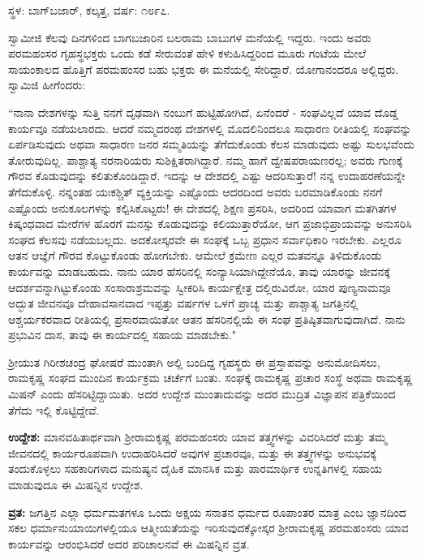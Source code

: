 \begin{center}
ಸ್ಥಳ: ಬಾಗ್‌ಬಜಾರ್, ಕಲ್ಕತ್ತ, ವರ್ಷ: ೧೮೯೭.
\end{center}

ಸ್ವಾಮೀಜಿ ಕೆಲವು ದಿನಗಳಿಂದ ಬಾಗಬಜಾರಿನ ಬಲರಾಮ ಬಾಬುಗಳ ಮನೆಯಲ್ಲಿ ಇದ್ದರು. ಇಂದು ಅವರು ಪರಮಹಂಸರ ಗೃಹಸ್ಥಭಕ್ತರು ಒಂದು ಕಡೆ ಸೇರುವಂತೆ ಹೇಳಿ ಕಳುಹಿಸಿದ್ದರಿಂದ ಮೂರು ಗಂಟೆಯ ಮೇಲೆ ಸಾಯಂಕಾಲದ ಹೊತ್ತಿಗೆ ಪರಮಹಂಸರ ಬಹು ಭಕ್ತರು ಈ ಮನೆಯಲ್ಲಿ ಸೇರಿದ್ದಾರೆ. ಯೋಗಾನಂದರೂ ಅಲ್ಲಿದ್ದರು. ಸ್ವಾಮಿಜಿ ಹೀಗೆಂದರು:

“ನಾನಾ ದೇಶಗಳನ್ನು ಸುತ್ತಿ ನನಗೆ ದೃಢವಾಗಿ ನಂಬುಗೆ ಹುಟ್ಟಿಹೋಗಿದೆ, ಏನೆಂದರೆ - ಸಂಘವಿಲ್ಲದೆ ಯಾವ ದೊಡ್ಡ ಕಾರ್ಯವೂ ನಡೆಯಲಾರದು. ಆದರೆ ನಮ್ಮದರಂಥ ದೇಶಗಳಲ್ಲಿ ಮೊದಲಿನಿಂದಲೂ ಸಾಧಾರಣ ರೀತಿಯಲ್ಲಿ ಸಂಘವನ್ನು ಏರ್ಪಡಿಸುವುದು ಅಥವಾ ಸಾಧಾರಣ ಜನರ ಸಮ್ಮತಿಯನ್ನು ತೆಗೆದುಕೊಂಡು ಕೆಲಸ ಮಾಡುವುದು ಅಷ್ಟು ಸುಲಭವೆಂದು ತೋರುವುದಿಲ್ಲ. ಪಾಶ್ಚಾತ್ಯ ನರನಾರಿಯರು ಸುಶಿಕ್ಷಿತರಾಗಿದ್ದಾರೆ. ನಮ್ಮ ಹಾಗೆ ದ್ವೇಷಪರಾಯಣರಲ್ಲ; ಅವರು ಗುಣಕ್ಕೆ ಗೌರವ ಕೊಡುವುದನ್ನು ಕಲಿತುಕೊಂಡಿದ್ದಾರೆ. ಇದನ್ನು ಆ ದೇಶದಲ್ಲಿ ಎಷ್ಟು ಆದರಿಸುತ್ತಾರೆ! ನನ್ನ ಉದಾಹರಣೆಯನ್ನೇ ತೆಗೆದುಕೊಳ್ಳಿ. ನನ್ನಂತಹ ಯಃಕಶ್ಚಿತ್ ವ್ಯಕ್ತಿಯನ್ನು ಎಷ್ಟೊಂದು ಆದರದಿಂದ ಅವರು ಬರಮಾಡಿಕೊಂಡು ನನಗೆ ಎಷ್ಟೊಂದು ಅನುಕೂಲಗಳನ್ನು ಕಲ್ಪಿಸಿಕೊಟ್ಟರು! ಈ ದೇಶದಲ್ಲಿ ಶಿಕ್ಷಣ ಪ್ರಸರಿಸಿ, ಅದರಿಂದ ಯಾವಾಗ ಮತಗಿತಗಳ ಕಿಷ್ಕಂಧವಾದ ಮೇರೆಗಳ ಹೊರಗೆ ಮನಸ್ಸು ಕೊಡುವುದನ್ನು ಕಲಿಯುತ್ತಾರೆಯೋ, ಆಗ ಪ್ರಜಾಭಿಪ್ರಾಯವನ್ನು ಅನುಸರಿಸಿ ಸಂಘದ ಕೆಲಸವು ನಡೆಯಬಲ್ಲದು. ಅದಕೋಸ್ಕರವೇ ಈ ಸಂಘಕ್ಕೆ ಒಬ್ಬ ಪ್ರಧಾನ ಸರ್ವಾಧಿಕಾರಿ ಇರಬೇಕು. ಎಲ್ಲರೂ ಆತನ ಆಜ್ಞೆಗೆ ಗೌರವ ಕೊಟ್ಟುಕೊಂಡು ಹೋಗಬೇಕು. ಆಮೇಲೆ ಕ್ರಮೇಣ ಎಲ್ಲರ ಮತವನ್ನೂ ತಿಳಿದುಕೊಂಡು ಕಾರ್ಯವನ್ನು ಮಾಡಬಹುದು. ನಾನು ಯಾರ ಹೆಸರಿನಲ್ಲಿ ಸಂನ್ಯಾಸಿಯಾಗಿದ್ದೇನೆಯೊ, ತಾವು ಯಾರನ್ನು ಜೀವನಕ್ಕೆ ಆದರ್ಶವನ್ನಾಗಿಟ್ಟುಕೊಂಡು ಸಂಸಾರಾಶ್ರಮವನ್ನು ಸ್ವೀಕರಿಸಿ ಕಾರ್ಯಕ್ಷೇತ್ರ ದಲ್ಲಿರುವಿರೋ, ಯಾರ ಪುಣ್ಯನಾಮವೂ ಅದ್ಭುತ ಜೀವನವೂ ದೇಹಾವಸಾನವಾದ ಇಪ್ಪತ್ತು ವರ್ಷಗಳ ಒಳಗೆ ಪ್ರಾಚ್ಯ ಮತ್ತು ಪಾಶ್ಚಾತ್ಯ ಜಗತ್ತಿನಲ್ಲಿ ಆಶ್ಚರ್ಯಕರವಾದ ರೀತಿಯಲ್ಲಿ ಪ್ರಸಾರವಾಯಿತೋ ಆತನ ಹೆಸರಿನಲ್ಲಿಯೆ ಈ ಸಂಘ ಪ್ರತಿಷ್ಠಿತವಾಗುವುದಾಗಿದೆ. ನಾನು ಪ್ರಭುವಿನ ದಾಸ, ತಾವು ಈ ಕಾರ್ಯದಲ್ಲಿ ಸಹಾಯ ಮಾಡಬೇಕು."

ಶ‍್ರೀಯುತ ಗಿರೀಶಚಂದ್ರ ಘೋಷರೆ ಮುಂತಾಗಿ ಅಲ್ಲಿ ಬಂದಿದ್ದ ಗೃಹಸ್ಥರು ಈ ಪ್ರಸ್ತಾಪವನ್ನು ಅನುಮೋದಿಸಲು, ರಾಮಕೃಷ್ಣ ಸಂಘದ ಮುಂದಿನ ಕಾರ್ಯಕ್ರಮ ಚರ್ಚೆಗೆ ಬಂತು. ಸಂಘಕ್ಕೆ ರಾಮಕೃಷ್ಣ ಪ್ರಚಾರ ಸಂಸ್ಥೆ ಅಥವಾ ರಾಮಕೃಷ್ಣ ಮಿಷನ್ ಎಂದು ಹೆಸರಿಟ್ಟಿದ್ದಾಯಿತು. ಅದರ ಉದ್ದೇಶ ಮುಂತಾದುವನ್ನು ಅದರ ಮುದ್ರಿತ ವಿಜ್ಞಾಪನ ಪತ್ರಿಕೆಯಿಂದ ತೆಗೆದು ಇಲ್ಲಿ ಕೊಟ್ಟಿದ್ದೇವೆ.

\textbf{ಉದ್ದೇಶ:} ಮಾನವಹಿತಾರ್ಥವಾಗಿ ಶ‍್ರೀರಾಮಕೃಷ್ಣ ಪರಮಹಂಸರು ಯಾವ ತತ್ತ್ವಗಳನ್ನು ವಿವರಿಸಿದರೆ ಮತ್ತು ತಮ್ಮ ಜೀವನದಲ್ಲಿ ಕಾರ್ಯರೂಪವಾಗಿ ಉದಾಹರಿಸಿದರೆ ಅವುಗಳ ಪ್ರಚಾರವೂ, ಮತ್ತು ಈ ತತ್ತ್ವಗಳನ್ನು ಅನುಭವಕ್ಕೆ ತಂದುಕೊಳ್ಳಲು ಸಹಕಾರಿಗಳಾದ ಮನುಷ್ಯನ ದೈಹಿಕ ಮಾನಸಿಕ ಮತ್ತು ಪಾರಮಾರ್ಥಿಕ ಉನ್ನತಿಗಳಲ್ಲಿ ಸಹಾಯ ಮಾಡುವುದೂ ಈ ಮಿಷನ್ನಿನ ಉದ್ದೇಶ.

\textbf{ವ್ರತ:} ಜಗತ್ತಿನ ಎಲ್ಲಾ ಧರ್ಮಮತಗಳೂ ಒಂದು ಅಕ್ಷಯ ಸನಾತನ ಧರ್ಮದ ರೂಪಾಂತರ ಮಾತ್ರ ಎಂಬ ಜ್ಞಾನದಿಂದ ಸಕಲ ಧರ್ಮಾನುಯಾಯಿಗಳಲ್ಲಿಯೂ ಆತ್ಮೀಯತೆಯನ್ನು ಇರಿಸುವುದಕ್ಕೋಸ್ಕರ ಶ‍್ರೀರಾಮಕೃಷ್ಣ ಪರಮಹಂಸರು ಯಾವ ಕಾರ್ಯವನ್ನು ಆರಂಭಿಸಿದರೆ ಅದರ ಪರಿಚಾಲನವೆ ಈ ಮಿಷನ್ನಿನ ವ್ರತ.

